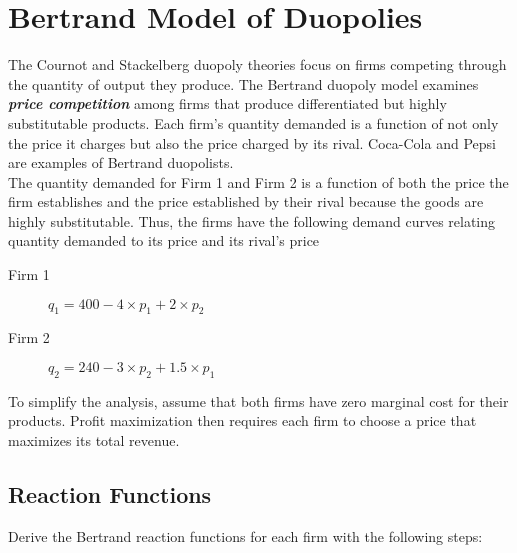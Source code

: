 \documentclass[a4paper,12pt]{article}
\begin{document}
\section*{Bertrand Model of Duopolies}
The Cournot and Stackelberg duopoly theories focus on firms competing through the quantity of output they produce. The Bertrand duopoly model examines \textbf{\textit{price competition}} among firms that produce differentiated but highly substitutable products. Each firm’s quantity demanded is a function of not only the price it charges but also the price charged by its rival. Coca-Cola and Pepsi are examples of Bertrand duopolists.\\

The quantity demanded for Firm 1 and Firm 2 is a function of both the price the firm establishes and the price established by their rival because the goods are highly substitutable. Thus, the firms have the following demand curves relating quantity demanded to its price and its rival’s price


\begin{description}
\item[Firm 1] $q_1 = 400 - 4\times p_1  + 2 \times p_2$ 
\item[Firm 2] $q_2 = 240 - 3\times p_2  + 1.5 \times p_1$ 
\end{description}

To simplify the analysis, assume that both firms have zero marginal cost for their products. Profit maximization then requires each firm to choose a price that maximizes its total revenue.

\subsection*{Reaction Functions}
Derive the Bertrand reaction functions for each firm with the following steps:
\end{document}
